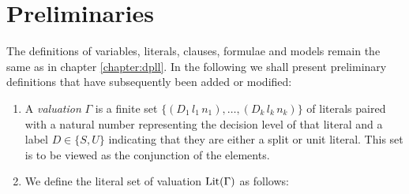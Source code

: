 \section{Preliminaries}
The definitions of variables, literals, clauses, formulae and models remain the same as in chapter \ref{chapter:dpll}. In the following we shall present preliminary definitions that have subsequently been added or modified: \\
%
%
\begin{mydef}
\hspace{3mm}
\begin{enumerate}

%
%
%
%
%
%
%
\item A \emph{valuation} $\Gamma$ is a finite set $\{ (D_1 \, l_1 \, n_1), \ldots , ( D_k \, l_k \, n_k) \}$ of literals paired with a natural number representing the decision level of that literal and a label $D \in \{S, U\}$ indicating that they are either a split or unit literal. This set is to be viewed as the conjunction of the elements.
%
\item We define the literal set of valuation $\mathrm{Lit}(\Gamma)$ as follows:

\end{enumerate}
\end{mydef}
